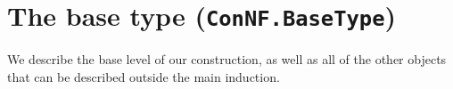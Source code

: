 \section{The base type (\texttt{ConNF.BaseType})}

We describe the base level of our construction, as well as all of the other objects that can be described outside the main induction.







